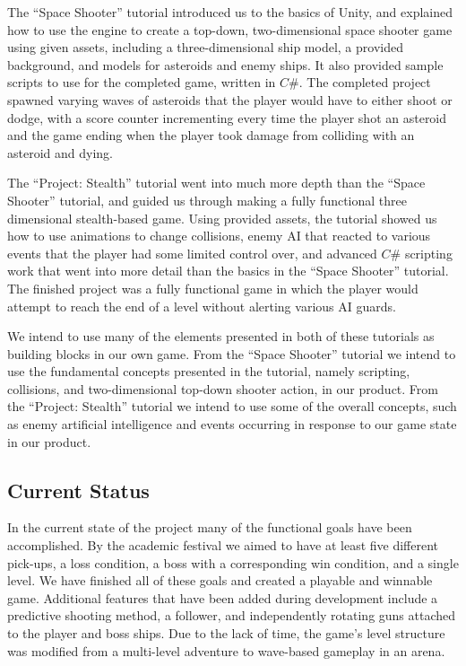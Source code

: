 \documentclass[12pt]{article}       %
\begin{document}
  The “Space Shooter” tutorial introduced us to the basics of Unity, and explained how to use the engine to create a top-down, two-dimensional space shooter game using given assets, including a three-dimensional ship model, a provided background, and models for asteroids and enemy ships. It also provided sample scripts to use for the completed game, written in $C\#$. The completed project spawned varying waves of asteroids that the player would have to either shoot or dodge, with a score counter incrementing every time the player shot an asteroid and the game ending when the player took damage from colliding with an asteroid and dying.

 The “Project: Stealth” tutorial went into much more depth than the “Space Shooter” tutorial, and guided us through making a fully functional three dimensional stealth-based game. Using provided assets, the tutorial showed us how to use animations to change collisions, enemy AI that reacted to various events that the player had some limited control over, and advanced $C\#$ scripting work that went into more detail than the basics in the “Space Shooter” tutorial. The finished project was a fully functional game in which the player would attempt to reach the end of a level without alerting various AI guards.

  We intend to use many of the elements presented in both of these tutorials as building blocks in our own game. From the “Space Shooter” tutorial we intend to use the fundamental concepts presented in the tutorial, namely scripting, collisions, and two-dimensional top-down shooter action, in our product. From the “Project: Stealth” tutorial we intend to use some of the overall concepts, such as enemy artificial intelligence and events occurring in response to our game state in our product.

\subsection{Current Status}

In the current state of the project many of the functional goals have been accomplished. By the academic festival we aimed to have at least five different pick-ups, a loss condition, a boss with a corresponding win condition, and a single level. We have finished all of these goals and created a playable and winnable game. Additional features that have been added during development include a predictive shooting method, a follower, and independently rotating guns attached to the player and boss ships. Due to the lack of time, the game's level structure was modified from a multi-level adventure to wave-based gameplay in an arena.
\end{document}
